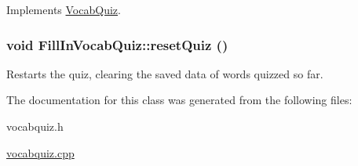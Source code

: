 Implements \hyperlink{classVocabQuiz}{VocabQuiz}.

\hypertarget{classFillInVocabQuiz_af0042ea53197503e5a5a6f25dcece8fd}{
\subsubsection[{resetQuiz}]{\setlength{\rightskip}{0pt plus 5cm}void FillInVocabQuiz::resetQuiz ()}}
\label{classFillInVocabQuiz_af0042ea53197503e5a5a6f25dcece8fd}
Restarts the quiz, clearing the saved data of words quizzed so far. 

The documentation for this class was generated from the following files:\begin{DoxyCompactItemize}
\item 
vocabquiz.h\item 
\hyperlink{vocabquiz_8cpp}{vocabquiz.cpp}\end{DoxyCompactItemize}
